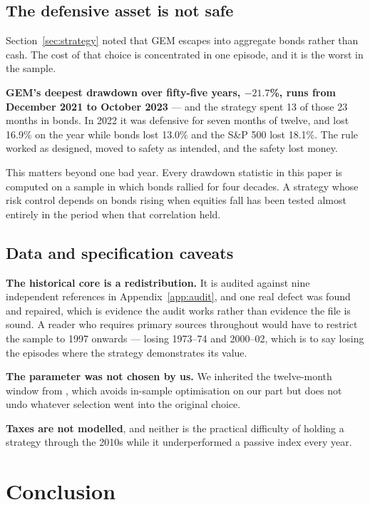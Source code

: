 \documentclass[11pt,a4paper]{article}
\let\oldsubsection\subsection
\renewcommand{\subsection}{\FloatBarrier\oldsubsection}
\let\oldsection\section
\renewcommand{\section}{\FloatBarrier\oldsection}
\begin{document}
\subsection{The defensive asset is not safe}

Section~\ref{sec:strategy} noted that GEM escapes into aggregate bonds rather
than cash. The cost of that choice is concentrated in one episode, and it is
the worst in the sample.

\textbf{GEM's deepest drawdown over fifty-five years, $-21.7$\%, runs from
December 2021 to October 2023} --- and the strategy spent 13 of those 23 months
in bonds. In 2022 it was defensive for seven months of twelve, and lost 16.9\%
on the year while bonds lost 13.0\% and the S\&P 500 lost 18.1\%. The rule
worked as designed, moved to safety as intended, and the safety lost money.

This matters beyond one bad year. Every drawdown statistic in this paper is
computed on a sample in which bonds rallied for four decades. A strategy whose
risk control depends on bonds rising when equities fall has been tested almost
entirely in the period when that correlation held.

\subsection{Data and specification caveats}

\textbf{The historical core is a redistribution.} It is audited against nine
independent references in Appendix~\ref{app:audit}, and one real defect was
found and repaired, which is evidence the audit works rather than evidence the
file is sound. A reader who requires primary sources throughout would have to
restrict the sample to 1997 onwards --- losing 1973--74 and 2000--02, which is
to say losing the episodes where the strategy demonstrates its value.

\textbf{The parameter was not chosen by us.} We inherited the twelve-month
window from \citet{antonacci2016}, which avoids in-sample optimisation on our
part but does not undo whatever selection went into the original choice.

\textbf{Taxes are not modelled}, and neither is the practical difficulty of
holding a strategy through the 2010s while it underperformed a passive index
every year.

\section{Conclusion}
\label{sec:conclusion}
\end{document}
